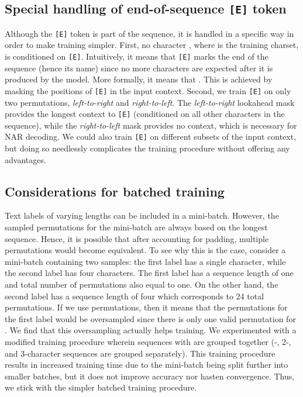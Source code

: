 \subsection{Special handling of end-of-sequence \texttt{[E]} token}

Although the \texttt{[E]} token is part of the sequence, it is handled in a specific way in order to make training simpler. First, no character , where  is the training charset, is conditioned on \texttt{[E]}. Intuitively, it means that \texttt{[E]} marks the end of the sequence (hence its name) since no more characters are expected after it is produced by the model. More formally, it means that . This is achieved by masking the positions of \texttt{[E]} in the input context. Second, we train \texttt{[E]} on only two permutations, \textit{left-to-right} and \textit{right-to-left}. The \textit{left-to-right} lookahead mask provides the longest context to \texttt{[E]} (conditioned on all other characters in the sequence), while the \textit{right-to-left} mask provides no context, which is necessary for NAR decoding. We could also train \texttt{[E]} on different subsets of the input context, but doing so needlessly complicates the training procedure without offering any advantages.

\subsection{Considerations for batched training}

Text labels of varying lengths can be included in a mini-batch. However, the sampled permutations for the mini-batch are always based on the longest sequence. Hence, it is possible that after accounting for padding, multiple permutations would become equivalent. To see why this is the case, consider a mini-batch containing two samples: the first label has a single character, while the second label has four characters. The first label has a sequence length of one and total number of permutations also equal to one. On the other hand, the second label has a sequence length of four which corresponds to 24 total permutations. If we use  permutations, then it means that the permutations for the first label would be oversampled since there is only one valid permutation for . We find that this oversampling actually helps training. We experimented with a modified training procedure wherein sequences with  are grouped together (-, 2-, and 3-character sequences are grouped separately). This training procedure results in increased training time due to the mini-batch being split further into smaller batches, but it does not improve accuracy nor hasten convergence. Thus, we stick with the simpler batched training procedure.

